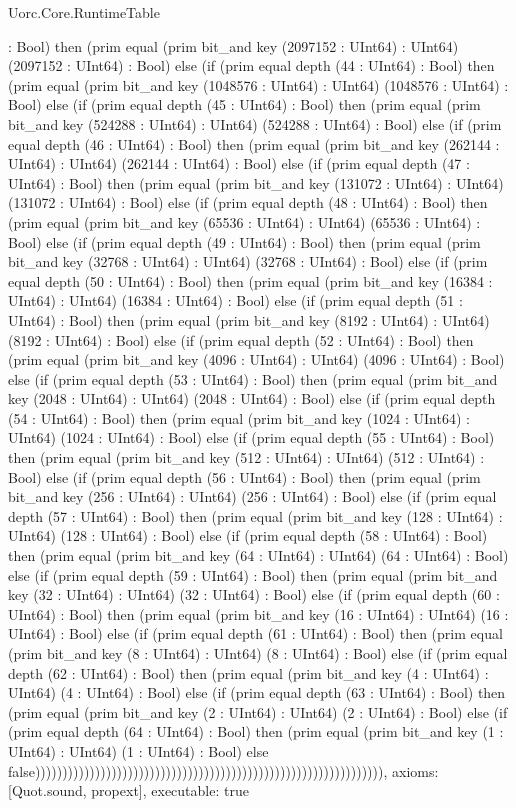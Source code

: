 \begin{lexlean}{Uorc.Core.RuntimeTable}
\begin{semanticmodule}
{: Bool) then (prim equal (prim bit_and key (2097152 : UInt64) : UInt64) (2097152 : UInt64) : Bool) else (if (prim equal depth (44 : UInt64) : Bool) then (prim equal (prim bit_and key (1048576 : UInt64) : UInt64) (1048576 : UInt64) : Bool) else (if (prim equal depth (45 : UInt64) : Bool) then (prim equal (prim bit_and key (524288 : UInt64) : UInt64) (524288 : UInt64) : Bool) else (if (prim equal depth (46 : UInt64) : Bool) then (prim equal (prim bit_and key (262144 : UInt64) : UInt64) (262144 : UInt64) : Bool) else (if (prim equal depth (47 : UInt64) : Bool) then (prim equal (prim bit_and key (131072 : UInt64) : UInt64) (131072 : UInt64) : Bool) else (if (prim equal depth (48 : UInt64) : Bool) then (prim equal (prim bit_and key (65536 : UInt64) : UInt64) (65536 : UInt64) : Bool) else (if (prim equal depth (49 : UInt64) : Bool) then (prim equal (prim bit_and key (32768 : UInt64) : UInt64) (32768 : UInt64) : Bool) else (if (prim equal depth (50 : UInt64) : Bool) then (prim equal (prim bit_and key (16384 : UInt64) : UInt64) (16384 : UInt64) : Bool) else (if (prim equal depth (51 : UInt64) : Bool) then (prim equal (prim bit_and key (8192 : UInt64) : UInt64) (8192 : UInt64) : Bool) else (if (prim equal depth (52 : UInt64) : Bool) then (prim equal (prim bit_and key (4096 : UInt64) : UInt64) (4096 : UInt64) : Bool) else (if (prim equal depth (53 : UInt64) : Bool) then (prim equal (prim bit_and key (2048 : UInt64) : UInt64) (2048 : UInt64) : Bool) else (if (prim equal depth (54 : UInt64) : Bool) then (prim equal (prim bit_and key (1024 : UInt64) : UInt64) (1024 : UInt64) : Bool) else (if (prim equal depth (55 : UInt64) : Bool) then (prim equal (prim bit_and key (512 : UInt64) : UInt64) (512 : UInt64) : Bool) else (if (prim equal depth (56 : UInt64) : Bool) then (prim equal (prim bit_and key (256 : UInt64) : UInt64) (256 : UInt64) : Bool) else (if (prim equal depth (57 : UInt64) : Bool) then (prim equal (prim bit_and key (128 : UInt64) : UInt64) (128 : UInt64) : Bool) else (if (prim equal depth (58 : UInt64) : Bool) then (prim equal (prim bit_and key (64 : UInt64) : UInt64) (64 : UInt64) : Bool) else (if (prim equal depth (59 : UInt64) : Bool) then (prim equal (prim bit_and key (32 : UInt64) : UInt64) (32 : UInt64) : Bool) else (if (prim equal depth (60 : UInt64) : Bool) then (prim equal (prim bit_and key (16 : UInt64) : UInt64) (16 : UInt64) : Bool) else (if (prim equal depth (61 : UInt64) : Bool) then (prim equal (prim bit_and key (8 : UInt64) : UInt64) (8 : UInt64) : Bool) else (if (prim equal depth (62 : UInt64) : Bool) then (prim equal (prim bit_and key (4 : UInt64) : UInt64) (4 : UInt64) : Bool) else (if (prim equal depth (63 : UInt64) : Bool) then (prim equal (prim bit_and key (2 : UInt64) : UInt64) (2 : UInt64) : Bool) else (if (prim equal depth (64 : UInt64) : Bool) then (prim equal (prim bit_and key (1 : UInt64) : UInt64) (1 : UInt64) : Bool) else false)))))))))))))))))))))))))))))))))))))))))))))))))))))))))))))))),
  axioms: [Quot.sound, propext],
  executable: true
}


\end{semanticmodule}
\end{lexlean}
